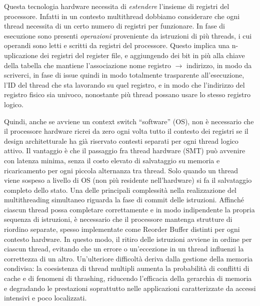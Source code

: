 \begin{figure}[ht]
    \centering
    \setlength{\fboxrule}{0.5pt} %
    \setlength{\fboxsep}{0pt}    %
\end{figure}

\noindent Questa tecnologia hardware necessita di \textit{estendere} l'insieme di registri del processore. Infatti in un contesto multithread dobbiamo considerare che ogni thread necessita di un certo numero di registri per funzionare. In fase di esecuzione sono presenti \textit{operazioni} proveniente da istruzioni di più threads, i cui operandi sono letti e scritti da registri del processore. Questo implica una n-uplicazione dei registri del register file, e aggiungendo dei bit in più alla chiave della tabella che mantiene l'associazione nome registro $\rightarrow$ indirizzo, in modo da scriverci, in fase di issue quindi in modo totalmente trasparente all'esecuzione, l'ID del thread che sta lavorando su quel registro, e in modo che l'indirizzo del registro fisico sia univoco, nonostante più thread possano usare lo stesso registro logico. 

\noindent Quindi, anche se avviene un context switch “software” (OS), non è necessario che il processore hardware ricrei da zero ogni volta tutto il contesto dei registri se il design architetturale ha già riservato contesti separati per ogni thread logico attivo. Il vantaggio è che il passaggio fra thread hardware (SMT) può avvenire con latenza minima, senza il costo elevato di salvataggio su memoria e ricaricamento per ogni piccola alternanza tra thread. Solo quando un thread viene sospeso a livello di OS (non più residente nell’hardware) si fa il salvataggio completo dello stato.
Una delle principali complessità nella realizzazione del multithreading simultaneo riguarda la fase di commit delle istruzioni. Affinché ciascun thread possa completare correttamente e in modo indipendente la propria sequenza di istruzioni, è necessario che il processore mantenga strutture di riordino separate, spesso implementate come Reorder Buffer distinti per ogni contesto hardware. In questo modo, il ritiro delle istruzioni avviene in ordine per ciascun thread, evitando che un errore o un'eccezione in un thread influenzi la correttezza di un altro. Un'ulteriore difficoltà deriva dalla gestione della memoria condivisa: la coesistenza di thread multipli aumenta la probabilità di conflitti di cache e di fenomeni di thrashing, riducendo l'efficacia della gerarchia di memoria e degradando le prestazioni soprattutto nelle applicazioni caratterizzate da accessi intensivi e poco localizzati.

